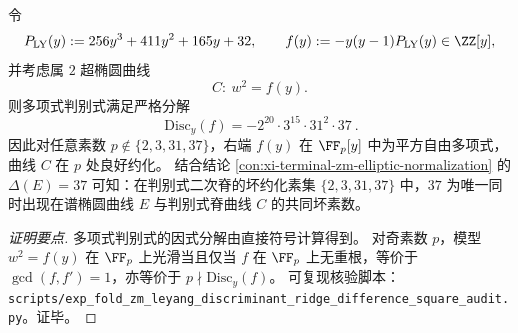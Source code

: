 

\begin{conclusion}\label{con:xi-terminal-zm-leyang-discriminant-ridge-polydisc-badprimes}
令
\[
P_{\mathrm{LY}}(y):=256y^{3}+411y^{2}+165y+32,\qquad
f(y):=-y(y-1)P_{\mathrm{LY}}(y)\in\ZZ[y],
\]
并考虑属 \(2\) 超椭圆曲线
\[
C:\ w^{2}=f(y).
\]
则多项式判别式满足严格分解
\[
\boxed{\ \mathrm{Disc}_{y}(f)=-2^{20}\cdot 3^{15}\cdot 31^{2}\cdot 37\ }.
\]
因此对任意素数 \(p\notin\{2,3,31,37\}\)，右端 \(f(y)\) 在 \(\FF_p[y]\) 中为平方自由多项式，曲线 \(C\) 在 \(p\) 处良好约化。
结合结论 \ref{con:xi-terminal-zm-elliptic-normalization} 的 \(\Delta(E)=37\) 可知：在判别式二次脊的坏约化素集 \(\{2,3,31,37\}\) 中，\(37\) 为唯一同时出现在谱椭圆曲线 \(E\) 与判别式脊曲线 \(C\) 的共同坏素数。
\end{conclusion}
\begin{proof}[证明要点]
多项式判别式的因式分解由直接符号计算得到。
对奇素数 \(p\)，模型 \(w^2=f(y)\) 在 \(\FF_p\) 上光滑当且仅当 \(f\) 在 \(\FF_p\) 上无重根，等价于 \(\gcd(f,f')=1\)，亦等价于 \(p\nmid \mathrm{Disc}_{y}(f)\)。
可复现核验脚本：\texttt{scripts/exp\_fold\_zm\_leyang\_discriminant\_ridge\_difference\_square\_audit.py}。证毕。
\end{proof}



